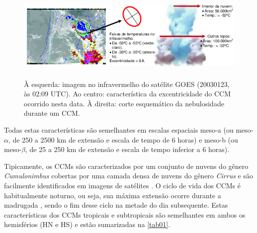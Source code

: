 \begin{figure}[!hpb]
\centering
\includegraphics[height=4.5cm]{./figs/fig08.png}
\caption{À esquerda: imagem no infravermelho do satélite GOES (20030123, às 02:09 UTC). Ao centro: característica da excentricidade do CCM ocorrido nesta data. À direita: corte esquemático da nebulosidade durante um CCM.}
\label{fig03}
\end{figure}

Todas estas características são semelhantes em escalas espaciais meso-a  (ou meso-$\alpha$, de 250 a 2500 km de extensão e escala de tempo de 6 horas) e meso-b (ou meso-$\beta$, de 25 a 250 km de extensão e escala de tempo inferior a 6 horas).

Tipicamente, os CCMs são caracterizados por um conjunto de nuvens do gênero \textit{Cumulonimbus} cobertas por uma camada densa de nuvens do gênero \textit{Cirrus} e são facilmente identificados em imagens de satélites \cite{silvadias87}. O ciclo de vida dos CCMs é habitualmente noturno, ou seja, sua máxima extensão ocorre durante a madrugada \cite{velascofritsch87}, sendo o fim desse ciclo na metade do dia subsequente. Estas características dos CCMs tropicais e subtropicais são semelhantes em ambos os hemisférios (HN e HS) e estão sumarizadas na \autoref{tab01}.

